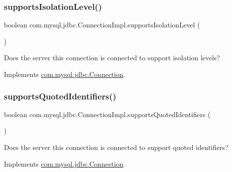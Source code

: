 \subsubsection{\texorpdfstring{supports\+Isolation\+Level()}{supportsIsolationLevel()}}
{\footnotesize\ttfamily boolean com.\+mysql.\+jdbc.\+Connection\+Impl.\+supports\+Isolation\+Level (\begin{DoxyParamCaption}{ }\end{DoxyParamCaption})}

Does the server this connection is connected to support isolation levels? 

Implements \mbox{\hyperlink{interfacecom_1_1mysql_1_1jdbc_1_1_connection_aea32f547f2d12d07de7792a6cdb20585}{com.\+mysql.\+jdbc.\+Connection}}.

\mbox{\label{classcom_1_1mysql_1_1jdbc_1_1_connection_impl_a0deb8354645d646aae3867f050d9b42e}} 
\subsubsection{\texorpdfstring{supports\+Quoted\+Identifiers()}{supportsQuotedIdentifiers()}}
{\footnotesize\ttfamily boolean com.\+mysql.\+jdbc.\+Connection\+Impl.\+supports\+Quoted\+Identifiers (\begin{DoxyParamCaption}{ }\end{DoxyParamCaption})}

Does the server this connection is connected to support quoted identifiers? 

Implements \mbox{\hyperlink{interfacecom_1_1mysql_1_1jdbc_1_1_connection_a16e68907781a09083ff1afda25dff502}{com.\+mysql.\+jdbc.\+Connection}}.

\mbox{\label{classcom_1_1mysql_1_1jdbc_1_1_connection_impl_a05086bca661351f54f5512f894effe81}} 
